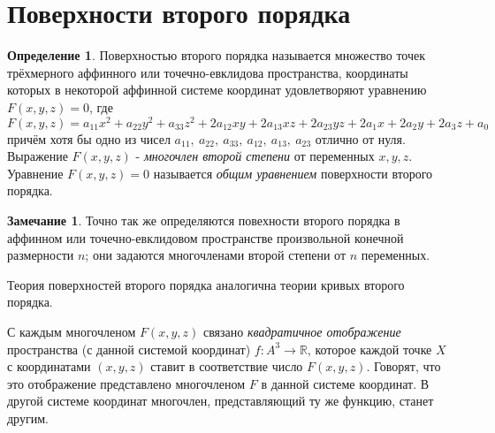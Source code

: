 \documentclass[a4paper, 12pt]{article}
\theoremstyle{definition}
\newtheorem*{definition}{Определение}
\newtheorem*{remark}{Замечание}
\begin{document}
\section{Поверхности второго порядка}

\begin{definition}
    Поверхностью второго порядка называется множество точек трёхмерного аффинного или точечно-евклидова пространства, координаты которых в некоторой аффинной системе координат удовлетворяют уравнению $F(x, y, z) = 0$, где
    \[ F(x, y, z) = a_{11} x^2 + a_{22} y^2 + a_{33} z^2 + 2a_{12} xy + 2a_{13} xz + 2a_{23} yz + 2a_1 x + 2a_2 y + 2a_3 z + a_0 \]
    причём хотя бы одно из чисел $a_{11}, \ a_{22}, \ a_{33}, \ a_{12}, \ a_{13}, \ a_{23}$ отлично от нуля. Выражение $F(x, y, z)$ - \textit{многочлен второй степени} от переменных $x, y, z$.
    Уравнение $F(x, y, z) = 0$ называется \textit{общим уравнением} поверхности второго порядка.
\end{definition}

\begin{remark}
    Точно так же определяются повехности второго порядка в аффинном или точечно-евклидовом пространстве произвольной конечной размерности $n$;
    они задаются многочленами второй степени от $n$ переменных.
\end{remark}

Теория поверхностей второго порядка аналогична теории кривых второго порядка.

С каждым многочленом $F(x,y,z)$ связано \textit{квадратичное отображение} пространства (с данной системой координат) $f: A^3 \to \mathbb{R}$, которое каждой точке $X$ с координатами $(x, y, z)$ ставит в соответствие число $F(x,y,z)$.
Говорят, что это отображение представлено многочленом $F$ в данной системе координат.
В другой системе координат многочлен, представляющий ту же функцию, станет другим.
\end{document}
